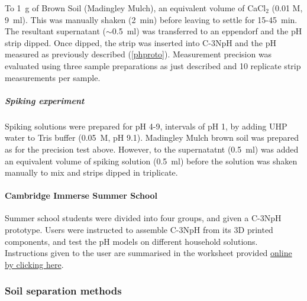 
To \SI{1}{g} of Brown Soil (Madingley Mulch), an equivalent volume of CaCl$_2$ (0.01 M, \SI{9}{\ml}). This was manually shaken (\SI{2}{\minute}) before leaving to settle for 15-\SI{45}{\minute}. The resultant supernatant ($\sim$\SI{0.5}{\ml}) was transferred to an eppendorf and the pH strip dipped. Once dipped, the strip was inserted into C-3NpH and the pH measured as previously described (\ref{phproto}). Measurement precision was evaluated using three sample preparations as just described and 10 replicate strip measurements per sample.


\subparagraph{Spiking experiment}
\noindent Spiking solutions were prepared for pH 4-9, intervals of pH 1, by adding \acrshort{UHP} water to Tris buffer (\SI{0.05}{M}, pH 9.1). %
Madingley Mulch brown soil was prepared %
as for the precision test above. However, %
to the supernatatnt (\SI{0.5}{\ml}) was added an equivalent volume of spiking solution (\SI{0.5}{\ml}) before the solution was shaken manually to mix and strips dipped in triplicate. 


\paragraph{Cambridge Immerse Summer School} \label{Summer_C-3NpH}
Summer school students were divided into four groups, %
and given a C-3NpH prototype. Users were instructed to assemble C-3NpH from its 3D printed components, and test the pH models on different household solutions. Instructions given to the user are summarised in the worksheet provided \href{https://universityofcambridgecloud-my.sharepoint.com/:f:/g/personal/eb729_cam_ac_uk/EtEn0MBg-2ZIjL1_mABHpa4BmyKOBFYg7WaYXhi8zPZieQ?e=zcijNp}{online by clicking here}.

\subsubsection{Soil separation methods}
